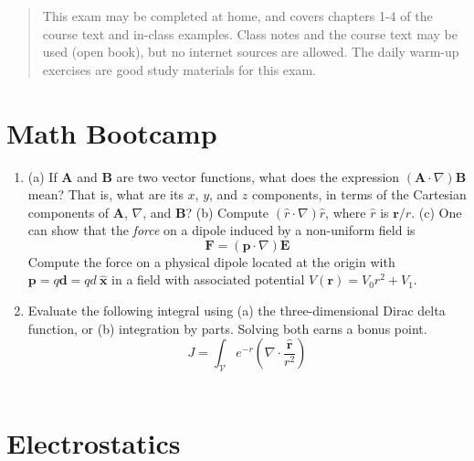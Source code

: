 \documentclass[10pt]{article}
\begin{document}
\maketitle

\begin{abstract}
This exam may be completed at home, and covers chapters 1-4 of the course text and in-class examples.  Class notes and the course text may be used (open book), but no internet sources are allowed.  The daily warm-up exercises are good study materials for this exam.
\end{abstract}
\noindent

\section{Math Bootcamp}

\begin{enumerate}
\item (a) If $\mathbf{A}$ and $\mathbf{B}$ are two vector functions, what does the expression $(\mathbf{A} \cdot \nabla) \mathbf{B}$ mean?  That is, what are its $x$, $y$, and $z$ components, in terms of the Cartesian components of $\mathbf{A}$, $\nabla$, and $\mathbf{B}$? (b) Compute $(\hat{r} \cdot \nabla) \hat{r}$, where $\hat{r}$ is $\mathbf{r}/r$. (c) One can show that the \textit{force} on a dipole induced by a non-uniform field is
\begin{equation}
\mathbf{F} = (\mathbf{p} \cdot \nabla) \mathbf{E}
\end{equation}
Compute the force on a physical dipole located at the origin with $\mathbf{p} = q \mathbf{d} = qd~\mathbf{\hat{x}}$ in a field with associated potential $V(\mathbf{r}) = V_0 r^2 + V_1$. \\ \vspace{3cm}
\item Evaluate the following integral using (a) the three-dimensional Dirac delta function, or (b) integration by parts.  Solving both earns a bonus point.
\begin{equation}
J = \int_{\mathcal{V}} e^{-r} \left( \nabla \cdot \frac{\mathbf{\hat{r}}}{r^2} \right)
\end{equation} \\ \vspace{2.5cm}
\end{enumerate}

\section{Electrostatics}
\end{document}
